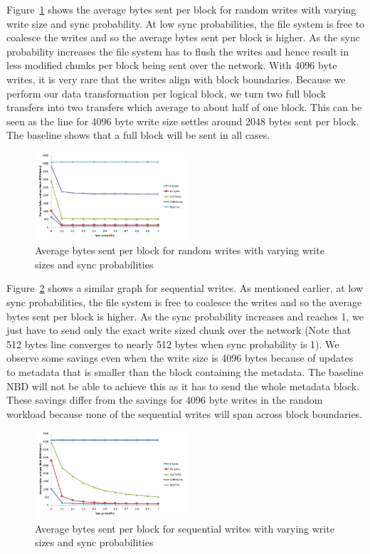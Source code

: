 \documentclass[10pt,twocolumn]{article}
\begin{document}
Figure~\ref{fig:randwrite} shows the average bytes sent per block for random
writes with varying write size and sync probability. %
At low sync probabilities, the file system is free to coalesce the writes and so
the average bytes sent per block is higher. %
As the sync probability increases the file system has to flush the writes and
hence result in less modified chunks per block being sent over the network. %
With 4096 byte writes, it is very rare that the writes align with block
boundaries. %
Because we perform our data transformation per logical block, we turn two full
block transfers into two transfers which average to about half of one block. %
This can be seen as the line for 4096 byte write size settles around 2048 bytes
sent per block. %
The baseline shows that a full block will be sent in all cases. %

\begin{figure}[t]
  \centering
  \includegraphics[width=0.50\textwidth]{figs/RandWrite.png}
  \caption{Average bytes sent per block for random writes with varying write sizes and sync 
  probabilities}
  \label{fig:randwrite}
\end{figure}

Figure~\ref{fig:seqwrite} shows a similar graph for sequential writes. %
As mentioned earlier, at low sync probabilities, the file system is free to
coalesce the writes and so the average bytes sent per block is higher. %
As the sync probability increases and reaches 1, we just have to send only the
exact write sized chunk over the network (Note that 512 bytes line converges to
nearly 512 bytes when sync probability is 1). %
We observe some savings even when the write size is 4096 bytes because of
updates to metadata that is smaller than the block containing the metadata. %
The baseline NBD will not be able to achieve this as it has to send the whole
metadata block. %
These savings differ from the savings for 4096 byte writes in the random
workload because none of the sequential writes will span across block
boundaries. %

\begin{figure}[t]
  \centering
  \includegraphics[width=0.50\textwidth]{figs/SeqWrite.png}
  \caption{Average bytes sent per block for sequential writes with varying write sizes and sync 
  probabilities}
  \label{fig:seqwrite}
\end{figure}
\end{document}
